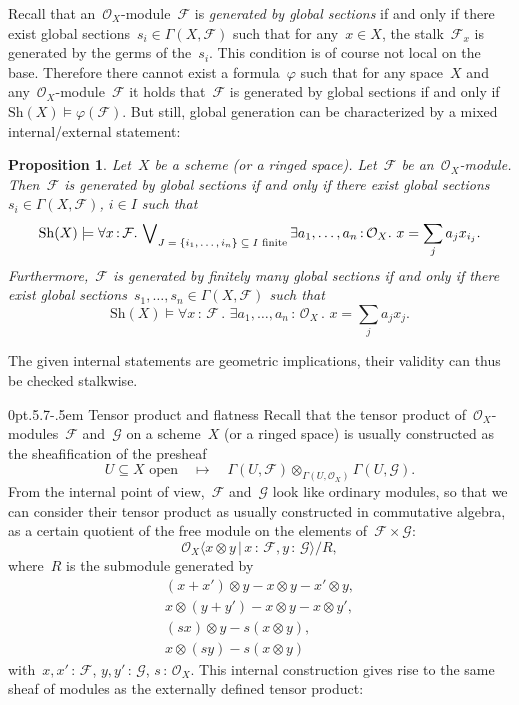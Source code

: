 \documentclass[10pt,reqno,a4paper]{amsbook}
\makeatletter
\theoremstyle{definition}
\theoremstyle{plain}
\newtheorem{prop}[defn]{Proposition}
\theoremstyle{remark}
\newcommand{\F}{\mathcal{F}}
\renewcommand{\G}{\mathcal{G}}
\renewcommand{\O}{\mathcal{O}}
\newcommand{\Sh}{\mathrm{Sh}}
\newcommand{\?}{\,{:}\,}
\renewcommand{\_}{\mathpunct{.}\,}
\renewenvironment{proof}[1][\proofname]{\par
  \pushQED{\qed}%
  \normalfont \topsep6\p@\@plus6\p@\relax
  \trivlist
  \item[\hskip\labelsep
        \itshape
    #1\@addpunct{.}]\ignorespaces
}{%
  \popQED\endtrivlist\@endpefalse
}
\def\subsection{\@startsection{subsection}{2}%
  {0pt}{.5\linespacing\@plus.7\linespacing}{-.5em}%
  {\normalfont\bfseries}}
\makeatother
\begin{document}
Recall that an~$\O_X$-module~$\F$ is \emph{generated by global sections} if and
only if there exist global sections~$s_i \in \Gamma(X,\F)$ such that for any~$x
\in X$, the stalk~$\F_x$ is generated by the germs of the~$s_i$.
This condition is of course not local on the base. Therefore there cannot
exist a formula~$\varphi$ such that for any space~$X$ and
any~$\O_X$-module~$\F$ it holds that~$\F$ is generated by global sections if
and only if~$\Sh(X) \models \varphi(\F)$. But still, global generation can be
characterized by a mixed internal/external statement:

\begin{prop}Let~$X$ be a scheme (or a ringed space). Let~$\F$ be
an~$\O_X$-module. Then~$\F$ is generated by global sections if and only if
there exist global sections~$s_i \in \Gamma(X,\F)$, $i \in I$ such that
\[ \Sh(X) \models \forall x\?\F\_ \bigvee\nolimits_{\textnormal{$J=\{i_1,\ldots,i_n\} \subseteq I$ finite}}
  \exists a_1,\ldots,a_n\?\O_X\_
  x = \sum_j a_j x_{i_j}. \]
Furthermore,~$\F$ is generated by finitely many global sections if and only if
there exist global sections~$s_1,\ldots,s_n \in \Gamma(X,\F)$ such that
\[ \Sh(X) \models \forall x\?\F\_ \exists a_1,\ldots,a_n\?\O_X\_ x = \sum_j a_j
x_j. \]
\end{prop}
\begin{proof}The given internal statements are geometric implications, their
validity can thus be checked stalkwise.\end{proof}


\subsection{Tensor product and flatness} Recall that the tensor product
of~$\O_X$-modules~$\F$ and~$\G$ on a scheme~$X$ (or a ringed space) is usually
constructed as the sheafification of the presheaf
\[ \text{$U \subseteq X$ open} \quad\longmapsto\quad \Gamma(U,\F) \otimes_{\Gamma(U,\O_X)}
\Gamma(U,\G). \]
From the internal point of view,~$\F$ and~$\G$ look like ordinary modules, so
that we can consider their tensor product as usually constructed in
commutative algebra, as a certain quotient of the free module on the elements
of~$\F \times \G$:
\[ \O_X\langle x \otimes y \,|\, x\?\F, y\?\G \rangle / R, \]
where~$R$ is the submodule generated by
\begin{gather*}
  (x+x') \otimes y - x \otimes y - x' \otimes y, \\
  x \otimes (y+y') - x \otimes y - x \otimes y', \\
  (sx) \otimes y - s(x \otimes y), \\
  x \otimes (sy) - s(x \otimes y)
\end{gather*}
with~$x,x'\?\F$, $y,y'\?\G$, $s\?\O_X$.
This internal construction gives rise to the same sheaf
of modules as the externally defined tensor product:
\end{document}
